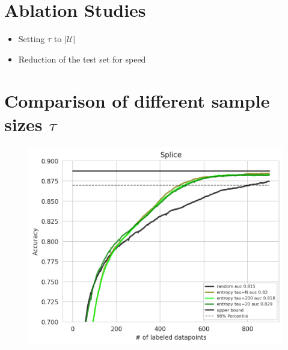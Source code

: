 \documentclass[]{article}
\begin{document}
\section{Ablation Studies}
\begin{itemize}
	\item Setting $\tau$ to $|\mathcal{U}|$
	\item Reduction of the test set for speed
\end{itemize}



 

\appendix

\section{Comparison of different sample sizes $\tau$}
\begin{figure}[H]
	\centering
	\includegraphics[width=0.7\linewidth]{img/tau_ablation.png}
\end{figure}
\end{document}
